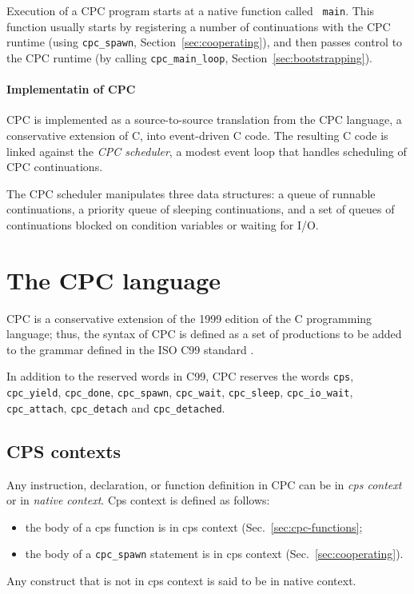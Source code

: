 \documentclass[a4paper]{report}
\begin{document}
Execution of a CPC program starts at a native function called {\tt
  main}.  This function usually starts by registering a number of
continuations with the CPC runtime (using {\tt cpc\_spawn},
Section~\ref{sec:cooperating}), and then passes control to the CPC
runtime (by calling {\tt cpc\_main\_loop}, Section~\ref{sec:bootstrapping}).

\paragraph{Implementatin of CPC}

CPC is implemented as a source-to-source translation from the CPC
language, a conservative extension of C, into event-driven C code.
The resulting C code is linked against the {\em CPC scheduler}, a
modest event loop that handles scheduling of CPC continuations.

The CPC scheduler manipulates three data structures: a queue of
runnable continuations, a priority queue of sleeping continuations,
and a set of queues of continuations blocked on condition variables or
waiting for I/O.

\section{The CPC language}

CPC is a conservative extension of the 1999 edition of the C
programming language; thus, the syntax of CPC is defined as a set of
productions to be added to the grammar defined in the ISO C99 standard
\cite{iso:c99}.

In addition to the reserved words in C99, CPC reserves the words
{\tt cps}, {\tt cpc\_yield}, {\tt cpc\_done}, {\tt cpc\_spawn}, 
{\tt cpc\_wait}, {\tt cpc\_sleep},
{\tt cpc\_io\_wait}, {\tt cpc\_attach}, {\tt cpc\_detach} and
{\tt cpc\_detached}.

\subsection{CPS contexts} \label{sec:contexts}

Any instruction, declaration, or function definition in CPC can be in
{\em cps context\/} or in {\em native context}.  Cps context is
defined as follows:
\begin{itemize}
\item the body of a cps function is in cps context
  (Sec.~\ref{sec:cpc-functions};
\item the body of a {\tt cpc\_spawn} statement is in cps context
  (Sec.~\ref{sec:cooperating}).
\end{itemize}
Any construct that is not in cps context is said to be in native
context.
\end{document}
